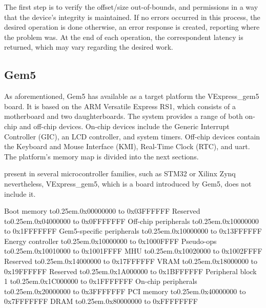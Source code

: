 The first step is to verify the offset/size out-of-bounds, and permissions in a way that the device's integrity is maintained. If no errors occurred 
in this process, the desired operation is done otherwise, an error response is created, reporting where the problem was. 
At the end of each operation, the correspondent latency is returned, which may vary regarding the desired work. 

\subsection{Gem5}

As aforementioned, Gem5 has available as a target platform the VExpress\_gem5 board. It is based on the ARM Versatile Express RS1, which 
consists of a motherboard and two daughterboards. The system provides a range of both on-chip and off-chip devices.
On-chip devices include the Generic Interrupt Controller (GIC), an LCD controller, and system timers.
Off-chip devices contain the Keyboard and Mouse Interface (KMI), Real-Time Clock (RTC), and \gls{uart}. 
The platform's memory map is divided into the next sections.

present in several microcontroller families, such as STM32 \cite{referenceManualRM0385} or Xilinx Zynq \cite{xilinx2014zynq} 
nevertheless, VExpress\_gem5, which is a board introduced by Gem5, does not include it.


\def\mydots{\xleaders\hbox to0.25em{\hfill.\hfill}\hfill}

\begin{outline}[enumerate]
	\1 Boot memory 						\mydots 	0x00000000 to 0x03FFFFFF
	\1 Reserved							\mydots 	0x04000000 to 0x0FFFFFFF
	\1 Off-chip peripherals				\mydots 	0x10000000 to 0x1FFFFFFF
		\2 Gem5-specific peripherals	\mydots 	0x10000000 to 0x13FFFFFF
			\3 Energy controller 		\mydots 	0x10000000 to 0x1000FFFF
			\3 Pseudo-ops				\mydots		0x10010000 to 0x1001FFFF
			\3 MHU						\mydots		0x10020000 to 0x1002FFFF
		\2 Reserved 					\mydots 	0x14000000 to 0x17FFFFFF
		\2 VRAM							\mydots		0x18000000 to 0x19FFFFFF
		\2 Reserved 					\mydots		0x1A000000 to 0x1BFFFFFF
		\2 Peripheral block 1			\mydots		0x1C000000 to 0x1FFFFFFF
	\1 On-chip  peripherals				\mydots 	0x20000000 to 0x3FFFFFFF
	\1 PCI memory 						\mydots 	0x40000000 to 0x7FFFFFFF
	\1 DRAM								\mydots 	0x80000000 to 0xFFFFFFFF
\end{outline}

